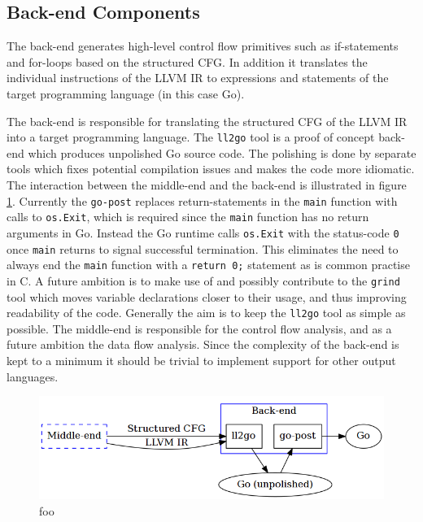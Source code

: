 
\subsection{Back-end Components}
\label{sec:design_back-end_components}


The back-end generates high-level control flow primitives such as if-statements and for-loops based on the structured CFG. In addition it translates the individual instructions of the LLVM IR to expressions and statements of the target programming language (in this case Go).

The back-end is responsible for translating the structured CFG of the LLVM IR into a target programming language. The \texttt{ll2go} tool is a proof of concept back-end which produces unpolished Go source code. The polishing is done by separate tools which fixes potential compilation issues and makes the code more idiomatic. The interaction between the middle-end and the back-end is illustrated in figure \ref{fig:back-end}. Currently the \texttt{go-post} replaces return-statements in the \texttt{main} function with calls to \texttt{os.Exit}, which is required since the \texttt{main} function has no return arguments in Go. Instead the Go runtime calls \texttt{os.Exit} with the status-code \texttt{0} once \texttt{main} returns to signal successful termination. This eliminates the need to always end the \texttt{main} function with a \texttt{return 0;} statement as is common practise in C. A future ambition is to make use of and possibly contribute to the \texttt{grind} tool which moves variable declarations closer to their usage, and thus improving readability of the code. Generally the aim is to keep the \texttt{ll2go} tool as simple as possible. The middle-end is responsible for the control flow analysis, and as a future ambition the data flow analysis. Since the complexity of the back-end is kept to a minimum it should be trivial to implement support for other output languages.

\begin{figure}[htbp]
	\begin{center}
		\includegraphics[width=\textwidth]{inc/back-end.png}
		\caption{foo}
		\label{fig:back-end}
	\end{center}
\end{figure}




